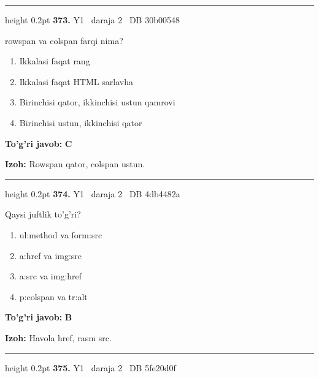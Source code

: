\documentclass[10pt,a4paper,oneside]{article}
\begin{document}
\vspace{2mm}\hrule height 0.2pt \vspace{4mm}
\hypertarget{q373}{\textbf{\color{ink}373.}}  {\color{muted}\scriptsize Y1 \textbullet\ daraja 2 \textbullet\ DB 30b00548}
\par
rowspan va colspan farqi nima?
\begin{enumerate}[label=\Alph*),leftmargin=9mm]
\item Ikkalasi faqat rang
\item Ikkalasi faqat HTML sarlavha
\item Birinchisi qator, ikkinchisi ustun qamrovi
\item Birinchisi ustun, ikkinchisi qator
\end{enumerate}
\begin{tcolorbox}[enhanced,breakable,colback=teal!4,colframe=teal!45!black,boxrule=0.45pt,arc=1.2mm,left=2.8mm,right=2.8mm,top=2mm,bottom=2mm,before skip=2mm,after skip=2mm]
\textbf{\color{teal}To'g'ri javob:} \textbf{C}
\par\smallskip
\textbf{Izoh:} Rowspan qator, colspan ustun.
\end{tcolorbox}
\vspace{2mm}\hrule height 0.2pt \vspace{4mm}
\hypertarget{q374}{\textbf{\color{ink}374.}}  {\color{muted}\scriptsize Y1 \textbullet\ daraja 2 \textbullet\ DB 4db4482a}
\par
Qaysi juftlik to'g'ri?
\begin{enumerate}[label=\Alph*),leftmargin=9mm]
\item ul:method va form:src
\item a:href va img:src
\item a:src va img:href
\item p:colspan va tr:alt
\end{enumerate}
\begin{tcolorbox}[enhanced,breakable,colback=teal!4,colframe=teal!45!black,boxrule=0.45pt,arc=1.2mm,left=2.8mm,right=2.8mm,top=2mm,bottom=2mm,before skip=2mm,after skip=2mm]
\textbf{\color{teal}To'g'ri javob:} \textbf{B}
\par\smallskip
\textbf{Izoh:} Havola href, rasm src.
\end{tcolorbox}
\vspace{2mm}\hrule height 0.2pt \vspace{4mm}
\hypertarget{q375}{\textbf{\color{ink}375.}}  {\color{muted}\scriptsize Y1 \textbullet\ daraja 2 \textbullet\ DB 5fe20d0f}
\end{document}
